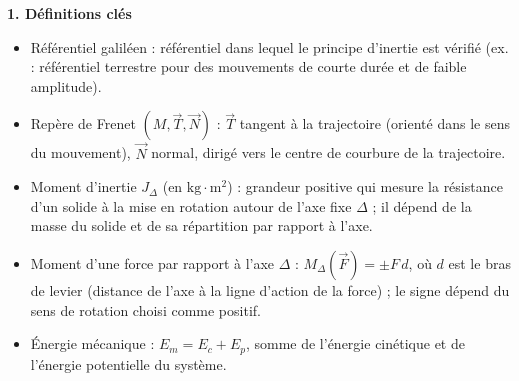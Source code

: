 \documentclass[11pt]{article}
\newcommand{\cle}[1]{{\popxbold\color{popdark}#1}}
\begin{document}
\begin{aretenir}

\textbf{1. Définitions clés}
\begin{itemize}
  \item \cle{Référentiel galiléen} : référentiel dans lequel le principe d'inertie est vérifié (ex. : référentiel terrestre pour des mouvements de courte durée et de faible amplitude).
  \item \cle{Repère de Frenet} $(M,\vec{T},\vec{N})$ : $\vec{T}$ tangent à la trajectoire (orienté dans le sens du mouvement), $\vec{N}$ normal, dirigé vers le centre de courbure de la trajectoire.
  \item \cle{Moment d'inertie} $J_\Delta$ (en $\mathrm{kg\cdot m^2}$) : grandeur positive qui mesure la résistance d'un solide à la mise en rotation autour de l'axe fixe $\Delta$ ; il dépend de la masse du solide et de sa répartition par rapport à l'axe.
  \item \cle{Moment d'une force} par rapport à l'axe $\Delta$ : $M_\Delta(\vec{F})=\pm F\,d$, où $d$ est le bras de levier (distance de l'axe à la ligne d'action de la force) ; le signe dépend du sens de rotation choisi comme positif.
  \item \cle{Énergie mécanique} : $E_m=E_c+E_p$, somme de l'énergie cinétique et de l'énergie potentielle du système.
\end{itemize}


\end{aretenir}
\end{document}
